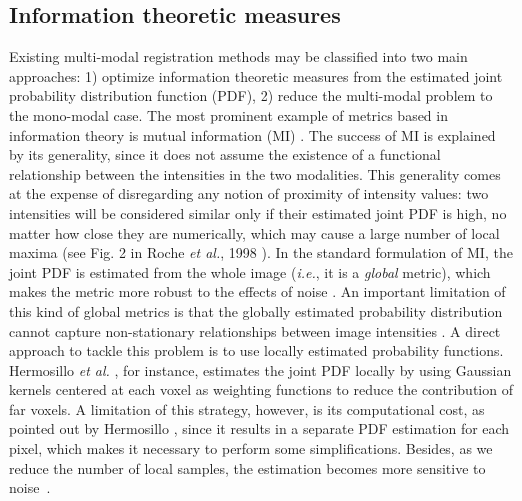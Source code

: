 \subsection{Information theoretic measures}
Existing multi-modal registration methods may be classified into two main approaches: 1) optimize information theoretic measures from the estimated joint probability distribution function (PDF), 2) reduce the multi-modal problem to the mono-modal case. The most prominent example of metrics based in information theory is mutual information (MI) \cite{Maes1997, Mattes2003}. The success of MI is explained by its generality, since it does not assume the existence of a functional relationship between the intensities in the two modalities. This generality comes at the expense of disregarding any notion of proximity of intensity values: two intensities will be considered similar only if their estimated joint PDF is high, no matter how close they are numerically, which may cause a large number of local maxima (see Fig. 2 in Roche {\it et al.}, 1998 \cite{Roche1998}). In the standard formulation of MI, the joint PDF is estimated from the whole image ({\it i.e.}, it is a {\it global} metric), which makes the metric more robust to the effects of noise \cite{Mattes2003}. An important limitation of this kind of global metrics is that the globally estimated probability distribution cannot capture non-stationary relationships between image intensities \cite{Hermosillo2004}. A direct approach to tackle this problem is to use locally estimated probability functions. Hermosillo {\it et al.} \cite{Hermosillo2004}, for instance, estimates the joint PDF locally by using Gaussian kernels centered at each voxel as weighting functions to reduce the contribution of far voxels. A limitation of this strategy, however, is its computational cost, as pointed out by Hermosillo \cite{Hermosillo2004}, since it results in a separate PDF estimation for each pixel, which makes it necessary to perform some simplifications. Besides, as we reduce the number of local samples, the estimation becomes more sensitive to noise~\cite{Mattes2003}.

\vspace{-0.2cm}
